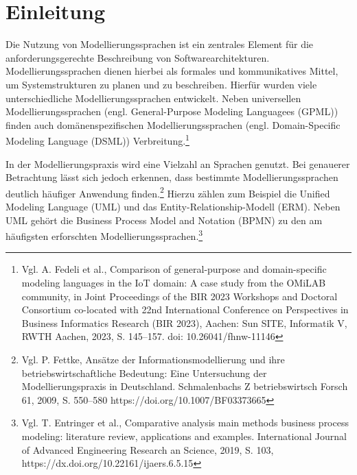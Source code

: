 

\lstset{language=C}

\chapter{Einleitung}

Die Nutzung von Modellierungssprachen ist ein zentrales Element für die anforderungsgerechte Beschreibung von Softwarearchitekturen. Modellierungssprachen dienen hierbei als formales und kommunikatives Mittel, um Systemstrukturen zu planen und zu beschreiben. Hierfür wurden viele unterschiedliche Modellierungssprachen entwickelt. Neben universellen Modellierungssprachen (engl. General-Purpose Modeling Languagees (GPML)) finden auch domänenspezifischen Modellierungssprachen (engl. Domain-Specific Modeling Language (DSML)) Verbreitung.\footnote{Vgl. A. Fedeli et al., Comparison of general-purpose and domain-specific modeling languages in the IoT domain: A case study from the OMiLAB community, in Joint Proceedings of the BIR 2023 Workshops and Doctoral Consortium co-located with 22nd International Conference on Perspectives in Business Informatics Research (BIR 2023), Aachen: Sun SITE, Informatik V, RWTH Aachen, 2023, S. 145–157. doi: 10.26041/fhnw-11146} 

In der Modellierungspraxis wird eine Vielzahl an Sprachen genutzt.
Bei genauerer Betrachtung lässt sich jedoch erkennen, dass bestimmte Modellierungssprachen deutlich häufiger Anwendung finden.\footnote{Vgl. P. Fettke, Ansätze der Informationsmodellierung und ihre betriebswirtschaftliche Bedeutung: Eine Untersuchung der Modellierungspraxis in Deutschland. Schmalenbachs Z betriebswirtsch Forsch 61, 2009, S. 550–580 https://doi.org/10.1007/BF03373665}
Hierzu zählen zum Beispiel die Unified Modeling Language (UML) und das Entity-Relationship-Modell (ERM). Neben UML gehört die Business Process Model and Notation (BPMN) zu den am häufigsten erforschten Modellierungssprachen.\footnote{Vgl. T. Entringer et al., Comparative analysis main methods business process modeling: literature review, applications and examples. International Journal of Advanced Engineering Research an Science, 2019, S. 103, https://dx.doi.org/10.22161/ijaers.6.5.15}
   
